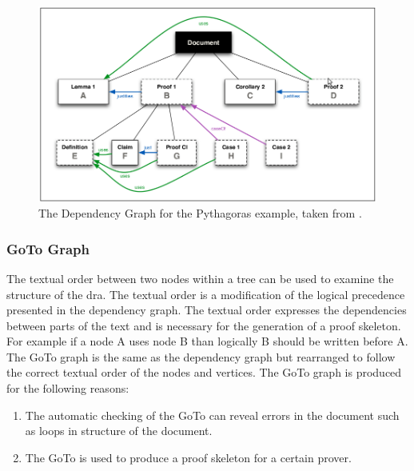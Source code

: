 \begin{figure}[H]
\begin{center}
\includegraphics[scale=0.45]{Figures/Background/pythdepgraph.png}
\end{center}
\caption{The Dependency Graph for the Pythagoras example, taken from \cite{zengfirstyear}. \label{fig:pydepgraph}}
\end{figure}

\subsubsection{GoTo Graph}

The textual order between two nodes within a tree can be used to examine the structure of the \gls{dra}. The textual order is a modification of the logical precedence presented in the dependency graph. The textual order expresses the dependencies between parts of the text and is necessary for the generation of a proof skeleton. For example if a node A uses node B than logically B should be written before A. The GoTo graph is the same as the dependency graph but rearranged to follow the correct textual order of the nodes and vertices. The GoTo graph is produced for the following reasons:

\begin{enumerate}
\item The automatic checking of the GoTo can reveal errors in the document such as loops in structure of the document.

\item The GoTo is used to produce a proof skeleton for a certain prover.
\end{enumerate}

